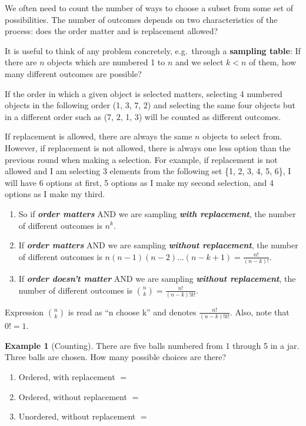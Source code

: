 \documentclass[
]{book}
\theoremstyle{definition}
\theoremstyle{definition}
\newtheorem{example}{Example}[chapter]
\theoremstyle{definition}
\theoremstyle{definition}
\theoremstyle{remark}
\begin{document}
We often need to count the number of ways to choose a subset from some set of possibilities. The number of outcomes depends on two characteristics of the process: does the order matter and is replacement allowed?

It is useful to think of any problem concretely, e.g.~through a \textbf{sampling table}: If there are \(n\) objects which are numbered 1 to \(n\) and we select \(k < n\) of them, how many different outcomes are possible?

If the order in which a given object is selected matters, selecting 4 numbered objects in the following order (1, 3, 7, 2) and selecting the same four objects but in a different order such as (7, 2, 1, 3) will be counted as different outcomes.

If replacement is allowed, there are always the same \(n\) objects to select from. However, if replacement is not allowed, there is always one less option than the previous round when making a selection. For example, if replacement is not allowed and I am selecting 3 elements from the following set \{1, 2, 3, 4, 5, 6\}, I will have 6 options at first, 5 options as I make my second selection, and 4 options as I make my third.

\begin{enumerate}
\def\labelenumi{\arabic{enumi}.}
\item
  So if \textbf{\emph{order matters}} AND we are sampling \textbf{\emph{with replacement}}, the number of different outcomes is \(n^k\).
\item
  If \textbf{\emph{order matters}} AND we are sampling \textbf{\emph{without replacement}}, the number of different outcomes is \(n(n-1)(n-2)...(n-k+1)=\frac{n!}{(n-k)!}\).
\item
  If \textbf{\emph{order doesn't matter}} AND we are sampling \textbf{\emph{without replacement}}, the number of different outcomes is \(\binom{n}{k} = \frac{n!}{(n-k)!k!}\).
\end{enumerate}

Expression \(\binom{n}{k}\) is read as ``n choose k'' and denotes \(\frac{n!}{(n-k)!k!}\). Also, note that \(0! = 1\).

\begin{example}[Counting]
\protect\hypertarget{exm:counting}{}{\label{exm:counting} {} }
There are five balls numbered from 1 through 5 in a jar. Three balls are chosen. How many possible choices are there?

\begin{enumerate}
\def\labelenumi{\arabic{enumi}.}
\item
  Ordered, with replacement \(=\)
\item
  Ordered, without replacement \(=\)
\item
  Unordered, without replacement \(=\)
\end{enumerate}
\end{example}
\end{document}
